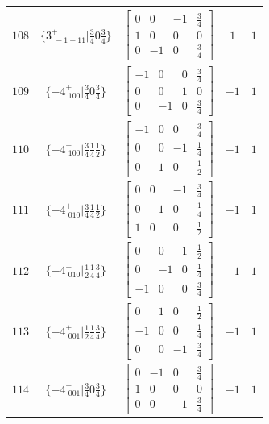 \documentclass[fleqn,8pt]{jsarticle}
\begin{document}
\begin{longtable}{ccccc}
$ 108 $ & $ \{3^{+}_{\,\,-1-11}|\frac{3}{4} 0 \frac{3}{4}\} $ & $ \begin{bmatrix} 0 & 0 & -1 & \frac{3}{4} \\ 1 & 0 & 0 & 0 \\ 0 & -1 & 0 & \frac{3}{4} \end{bmatrix} $ & $ 1 $ & $ 1 $ \\ \hline
$ 109 $ & $ \{-4^{+}_{\,\,100}|\frac{3}{4} 0 \frac{3}{4}\} $ & $ \begin{bmatrix} -1 & 0 & 0 & \frac{3}{4} \\ 0 & 0 & 1 & 0 \\ 0 & -1 & 0 & \frac{3}{4} \end{bmatrix} $ & $ -1 $ & $ 1 $ \\ \hline
$ 110 $ & $ \{-4^{-}_{\,\,100}|\frac{3}{4} \frac{1}{4} \frac{1}{2}\} $ & $ \begin{bmatrix} -1 & 0 & 0 & \frac{3}{4} \\ 0 & 0 & -1 & \frac{1}{4} \\ 0 & 1 & 0 & \frac{1}{2} \end{bmatrix} $ & $ -1 $ & $ 1 $ \\ \hline
$ 111 $ & $ \{-4^{+}_{\,\,010}|\frac{3}{4} \frac{1}{4} \frac{1}{2}\} $ & $ \begin{bmatrix} 0 & 0 & -1 & \frac{3}{4} \\ 0 & -1 & 0 & \frac{1}{4} \\ 1 & 0 & 0 & \frac{1}{2} \end{bmatrix} $ & $ -1 $ & $ 1 $ \\ \hline
$ 112 $ & $ \{-4^{-}_{\,\,010}|\frac{1}{2} \frac{1}{4} \frac{3}{4}\} $ & $ \begin{bmatrix} 0 & 0 & 1 & \frac{1}{2} \\ 0 & -1 & 0 & \frac{1}{4} \\ -1 & 0 & 0 & \frac{3}{4} \end{bmatrix} $ & $ -1 $ & $ 1 $ \\ \hline
$ 113 $ & $ \{-4^{+}_{\,\,001}|\frac{1}{2} \frac{1}{4} \frac{3}{4}\} $ & $ \begin{bmatrix} 0 & 1 & 0 & \frac{1}{2} \\ -1 & 0 & 0 & \frac{1}{4} \\ 0 & 0 & -1 & \frac{3}{4} \end{bmatrix} $ & $ -1 $ & $ 1 $ \\ \hline
$ 114 $ & $ \{-4^{-}_{\,\,001}|\frac{3}{4} 0 \frac{3}{4}\} $ & $ \begin{bmatrix} 0 & -1 & 0 & \frac{3}{4} \\ 1 & 0 & 0 & 0 \\ 0 & 0 & -1 & \frac{3}{4} \end{bmatrix} $ & $ -1 $ & $ 1 $ \\ \hline

\end{longtable}
\end{document}
